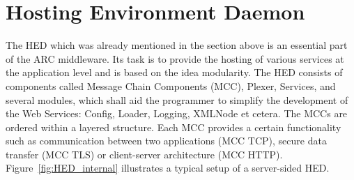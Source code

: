 

 


\section{Hosting Environment Daemon}

The HED which was already mentioned in the section above is an essential part of the ARC middleware. 
Its task is to provide the hosting of various services at the application level and is based on the idea modularity. %
The HED consists of components called Message Chain Components (MCC), Plexer, Services, and several modules, which shall aid the programmer to simplify the development of the Web Services: Config, Loader, Logging, XMLNode et cetera.
The MCCs are ordered within a layered structure. 
Each MCC provides a certain functionality such as communication between two applications (MCC TCP), secure data transfer (MCC TLS) or client-server architecture (MCC HTTP).
Figure~\ref{fig:HED_internal} illustrates a typical setup of a server-sided HED.

